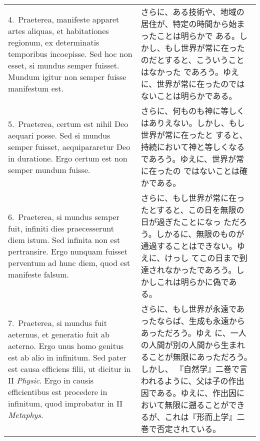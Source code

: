 \documentclass[10pt]{jsarticle} %
\begin{document}
\begin{longtable}{p{21em}p{21em}}
\\


4.~{\sc Praeterea}, manifeste apparet artes aliquas, et habitationes
 regionum, ex determinatis temporibus incoepisse. Sed hoc non esset, si
 mundus semper fuisset. Mundum igitur non semper fuisse manifestum est.


 &
 
さらに、ある技術や、地域の居住が、特定の時間から始まったことは明らかで
ある。しかし、もし世界が常に在ったのだとすると、こういうことはなかった
であろう。ゆえに、世界が常に在ったのではないことは明らかである。

\\


5.~{\sc Praeterea}, certum est nihil Deo aequari posse. Sed si mundus
 semper fuisset, aequipararetur Deo in duratione. Ergo certum est non
 semper mundum fuisse.

 &
 
さらに、何ものも神に等しくはありえない。しかし、もし世界が常に在ったと
すると、持続において神と等しくなるであろう。ゆえに、世界が常に在ったの
ではないことは確かである。

\\


6.~{\sc Praeterea}, si mundus semper fuit, infiniti dies praecesserunt
 diem istum. Sed infinita non est pertransire. Ergo nunquam fuisset
 perventum ad hunc diem, quod est manifeste falsum.

&

さらに、もし世界が常に在ったとすると、この日を無限の日が過ぎたことになっ
ただろう。しかるに、無限のものが通過することはできない。ゆえに、けっし
てこの日まで到達されなかったであろう。しかしこれは明らかに偽である。

\\


7.~{\sc Praeterea}, si mundus fuit aeternus, et generatio fuit ab
 aeterno. Ergo unus homo genitus est ab alio in infinitum. Sed pater est
 causa efficiens filii, ut dicitur in II {\it Physic}. Ergo in causis
 efficientibus est procedere in infinitum, quod improbatur in II
 {\it Metaphys}.

 &
 
さらに、もし世界が永遠であったならば、生成も永遠からあっただろう。ゆえ
に、一人の人間が別の人間から生まれることが無限にあっただろう。しかし、
『自然学』二巻で言われるように、父は子の作出因である。ゆえに、作出因に
おいて無限に遡ることができるが、これは『形而上学』二巻で否定されている。

\\



\end{longtable}
\end{document}
